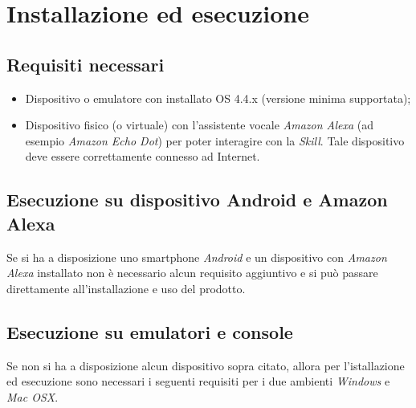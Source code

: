 \clearpage
\clearpage
\section{Installazione ed esecuzione}
\label{sec:installazione}
\subsection{Requisiti necessari}
\label{sec:requisiti_software}
\begin{itemize}
	\item Dispositivo o emulatore con installato  OS 4.4.x (versione minima supportata);
	\item Dispositivo fisico (o virtuale) con l'assistente vocale \textit{\Gls{Amazon} \Gls{Alexa}} (ad esempio \textit{Amazon Echo Dot}) per poter interagire con la \textit{Skill}.
	Tale dispositivo deve essere correttamente connesso ad Internet.
\end{itemize}
\subsection{Esecuzione su dispositivo Android e Amazon Alexa}
Se si ha a disposizione uno smartphone \textit{Android} e un dispositivo con \textit{Amazon Alexa} installato non è necessario alcun requisito aggiuntivo e si può passare direttamente all'installazione e uso del prodotto.  
\subsection{Esecuzione su emulatori e console}
Se non si ha a disposizione alcun dispositivo sopra citato, allora per l'istallazione ed esecuzione sono necessari i seguenti requisiti per i due ambienti \textit{Windows} e \textit{Mac OSX}.
